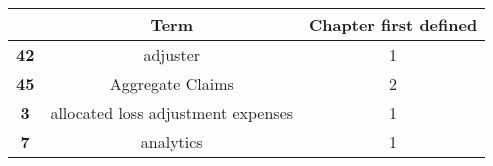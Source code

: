 \documentclass[]{book}
\theoremstyle{definition}
\theoremstyle{definition}
\theoremstyle{definition}
\theoremstyle{remark}
\begin{document}
\begin{longtable}[]{@{}ccc@{}}
\toprule
\begin{minipage}[b]{0.11\columnwidth}\centering\strut
~\strut
\end{minipage} & \begin{minipage}[b]{0.42\columnwidth}\centering\strut
Term\strut
\end{minipage} & \begin{minipage}[b]{0.29\columnwidth}\centering\strut
Chapter first defined\strut
\end{minipage}\tabularnewline
\midrule
\endhead
\begin{minipage}[t]{0.11\columnwidth}\centering\strut
\textbf{42}\strut
\end{minipage} & \begin{minipage}[t]{0.42\columnwidth}\centering\strut
adjuster\strut
\end{minipage} & \begin{minipage}[t]{0.29\columnwidth}\centering\strut
1\strut
\end{minipage}\tabularnewline
\begin{minipage}[t]{0.11\columnwidth}\centering\strut
\textbf{45}\strut
\end{minipage} & \begin{minipage}[t]{0.42\columnwidth}\centering\strut
Aggregate Claims\strut
\end{minipage} & \begin{minipage}[t]{0.29\columnwidth}\centering\strut
2\strut
\end{minipage}\tabularnewline
\begin{minipage}[t]{0.11\columnwidth}\centering\strut
\textbf{3}\strut
\end{minipage} & \begin{minipage}[t]{0.42\columnwidth}\centering\strut
allocated loss adjustment expenses\strut
\end{minipage} & \begin{minipage}[t]{0.29\columnwidth}\centering\strut
1\strut
\end{minipage}\tabularnewline
\begin{minipage}[t]{0.11\columnwidth}\centering\strut
\textbf{7}\strut
\end{minipage} & \begin{minipage}[t]{0.42\columnwidth}\centering\strut
analytics\strut
\end{minipage} & \begin{minipage}[t]{0.29\columnwidth}\centering\strut
1\strut

\end{minipage}
\end{longtable}
\end{document}
